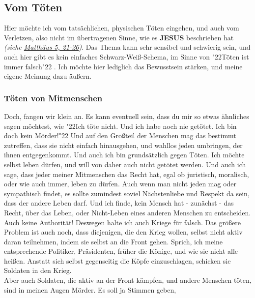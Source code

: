 \documentclass[10pt,a5paper]{article}
\newcommand{\Jesus}[0]{\textbf{JESUS}}
\newcommand{\q}[1]{\char"22{#1}\char"22 }
\begin{document}
	\subsection{Vom T\"oten}
		Hier m\"ochte ich vom tats\"achlichen,
		physischen T\"oten eingehen,
		und auch vom Verletzen,
		also nicht im \"ubertragenen Sinne,
		wie es {\Jesus} beschrieben hat
		\textit{(siehe \href{https://www.die-bibel.de/bibeln/online-bibeln/lesen/LU17/MAT.5/Matthäus-5}{Matthäus 5, 21-26})}.
		Das Thema kann sehr sensibel und schwierig sein,
		und auch hier gibt es kein einfaches Schwarz-Wei{\ss}-Schema,
		im Sinne von \q{T\"oten ist immer falsch}.
		Ich m\"ochte hier lediglich das Bewusstsein st\"arken,
		und meine eigene Meinung dazu \"au{\ss}ern.
	
	\subsubsection{T\"oten von Mitmenschen}
		Doch, fangen wir klein an.
		Es kann eventuell sein,
		dass du mir so etwas \"ahnliches sagen m\"ochtest,
		wie \q{Ich t\"ote nicht.
		Und ich habe noch nie get\"otet.
		Ich bin doch kein M\"order!}
		Und auf den Gro{\ss}teil der Menschen mag das bestimmt zutreffen,
		dass sie nicht einfach hinausgehen,
		und wahllos jeden umbringen,
		der ihnen entgegenkommt.
		Und auch ich bin grunds\"atzlich gegen T\"oten.
		Ich m\"ochte selbst leben d\"urfen,
		und will von daher auch nicht get\"otet werden.
		Und auch ich sage,
		dass jeder meiner Mitmenschen das Recht hat,
		egal ob juristisch,
		moralisch,
		oder wie auch immer,
		leben zu d\"urfen.
		Auch wenn man nicht jeden mag oder sympathisch findet,
		es sollte zumindest soviel N\"achstenliebe und Respekt da sein,
		dass der andere Leben darf.
		Und ich finde,
		kein Mensch hat - zun\"achst - das Recht,
		\"uber das Leben,
		oder Nicht-Leben eines anderen Menschen zu entscheiden.
		\\
		Auch keine Authorit\"at!
		Deswegen halte ich auch Kriege f\"ur falsch.
		Das gr\"o{\ss}ere Problem ist auch noch,
		dass diejenigen,
		die den Krieg wollen,
		selbst nicht aktiv daran teilnehmen,
		indem sie selbst an die Front gehen.
		Sprich,
		ich meine entsprechende Politiker,
		Pr\"asidenten,
		fr\"uher die K\"onige,
		und wie sie nicht alle hei{\ss}en.
		Anstatt sich selbst gegenseitig die K\"opfe einzuschlagen,
		schicken sie Soldaten in den Krieg.
		\\
		Aber auch Soldaten,
		die aktiv an der Front k\"ampfen,
		und andere Menschen t\"oten,
		sind in meinen Augen M\"order.
		Es soll ja Stimmen geben,
\end{document}
